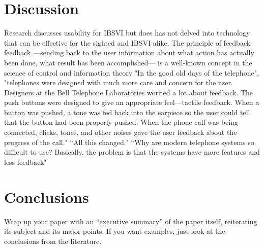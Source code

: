 \documentclass{article}
\begin{document}
\section{Discussion}
Research discusses usability for IBSVI but does has not delved into technology that can be effective for the sighted and IBSVI alike.
The principle of feedback
feedback ---sending back to the user information about what action has actually been done, what result has been accomplished--- is a well-known concept in the science of control and information theory\cite{Norman02} "In the good old days of the telephone", "telephones were designed with much more care and concern for the user. Designers at the Bell Telephone Laboratories worried a lot about feedback. The push buttons were designed to give an appropriate feel---tactile feedback. When a button was pushed, a tone was fed back into the earpiece so the user could tell that the button had been properly pushed. When the phone call was being connected, clicks, tones, and other noises gave the user feedback about the progress of the call." ``All this changed." ``Why are modern telephone systems so difficult to use? Basically, the problem is that the systems have more features and less feedback"

\section{Conclusions}


Wrap up your paper with an ``executive summary'' of the paper itself, reiterating its subject and its major points.  If you want examples, just look at the conclusions from the literature.
\clearpage


{}

\end{document}
